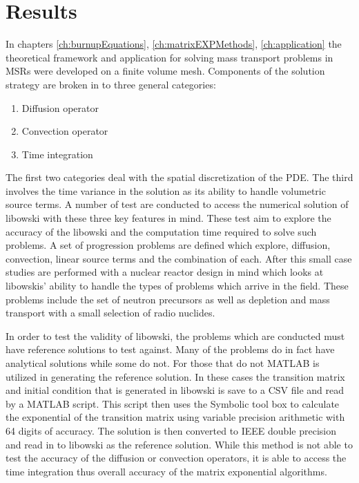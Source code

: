 \chapter{Results}\label{ch:results}

In chapters \ref{ch:burnupEquations}, \ref{ch:matrixEXPMethods}, \ref{ch:application} the theoretical framework and application for solving mass transport problems in MSRs were developed on a finite volume mesh. Components of the solution strategy are broken in to three general categories:

\begin{enumerate}
    \item Diffusion operator
    \item Convection operator
    \item Time integration
\end{enumerate}

\noindent The first two categories deal with the spatial discretization of the PDE. The third involves the time variance in the solution as its ability to handle volumetric source terms. A number of test are conducted to access the numerical solution of libowski with these three key features in mind. These test aim to explore the accuracy of the libowski and the computation time required to solve such problems. A set of progression problems are defined which explore, diffusion, convection, linear source terms and the combination of each. After this small case studies are performed with a nuclear reactor design in mind which looks at libowskis' ability to handle the types of problems which arrive in the field. These problems include the set of neutron precursors as well as depletion and mass transport with a small selection of radio nuclides. 

In order to test the validity of libowski, the problems which are conducted must have reference solutions to test against. Many of the problems do in fact have analytical solutions while some do not. For those that do not MATLAB is utilized in generating the reference solution. In these cases the transition matrix and initial condition that is generated in libowski is save to a CSV file and read by a MATLAB script. This script then uses the Symbolic tool box to calculate the exponential of the transition matrix using variable precision arithmetic with 64 digits of accuracy. The solution is then converted to IEEE double precision and read in to libowski as the reference solution. While this method is not able to test the accuracy of the diffusion or convection operators, it is able to access the time integration thus overall accuracy of the matrix exponential algorithms. 

